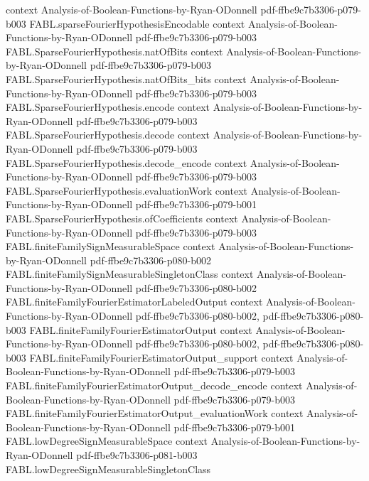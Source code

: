 \begin{theorem}
  {context}
  {Analysis-of-Boolean-Functions-by-Ryan-ODonnell}
  {pdf-ffbe9c7b3306-p079-b003}
\proofstep
  {FABL.sparseFourierHypothesisEncodable}
  {context}
  {Analysis-of-Boolean-Functions-by-Ryan-ODonnell}
  {pdf-ffbe9c7b3306-p079-b003}
\proofstep
  {FABL.SparseFourierHypothesis.natOfBits}
  {context}
  {Analysis-of-Boolean-Functions-by-Ryan-ODonnell}
  {pdf-ffbe9c7b3306-p079-b003}
\proofstep
  {FABL.SparseFourierHypothesis.natOfBits_bits}
  {context}
  {Analysis-of-Boolean-Functions-by-Ryan-ODonnell}
  {pdf-ffbe9c7b3306-p079-b003}
\proofstep
  {FABL.SparseFourierHypothesis.encode}
  {context}
  {Analysis-of-Boolean-Functions-by-Ryan-ODonnell}
  {pdf-ffbe9c7b3306-p079-b003}
\proofstep
  {FABL.SparseFourierHypothesis.decode}
  {context}
  {Analysis-of-Boolean-Functions-by-Ryan-ODonnell}
  {pdf-ffbe9c7b3306-p079-b003}
\proofstep
  {FABL.SparseFourierHypothesis.decode_encode}
  {context}
  {Analysis-of-Boolean-Functions-by-Ryan-ODonnell}
  {pdf-ffbe9c7b3306-p079-b003}
\proofstep
  {FABL.SparseFourierHypothesis.evaluationWork}
  {context}
  {Analysis-of-Boolean-Functions-by-Ryan-ODonnell}
  {pdf-ffbe9c7b3306-p079-b001}
\proofstep
  {FABL.SparseFourierHypothesis.ofCoefficients}
  {context}
  {Analysis-of-Boolean-Functions-by-Ryan-ODonnell}
  {pdf-ffbe9c7b3306-p079-b003}
\proofstep
  {FABL.finiteFamilySignMeasurableSpace}
  {context}
  {Analysis-of-Boolean-Functions-by-Ryan-ODonnell}
  {pdf-ffbe9c7b3306-p080-b002}
\proofstep
  {FABL.finiteFamilySignMeasurableSingletonClass}
  {context}
  {Analysis-of-Boolean-Functions-by-Ryan-ODonnell}
  {pdf-ffbe9c7b3306-p080-b002}
\proofstep
  {FABL.finiteFamilyFourierEstimatorLabeledOutput}
  {context}
  {Analysis-of-Boolean-Functions-by-Ryan-ODonnell}
  {pdf-ffbe9c7b3306-p080-b002,
    pdf-ffbe9c7b3306-p080-b003}
\proofstep
  {FABL.finiteFamilyFourierEstimatorOutput}
  {context}
  {Analysis-of-Boolean-Functions-by-Ryan-ODonnell}
  {pdf-ffbe9c7b3306-p080-b002,
    pdf-ffbe9c7b3306-p080-b003}
\proofstep
  {FABL.finiteFamilyFourierEstimatorOutput_support}
  {context}
  {Analysis-of-Boolean-Functions-by-Ryan-ODonnell}
  {pdf-ffbe9c7b3306-p079-b003}
\proofstep
  {FABL.finiteFamilyFourierEstimatorOutput_decode_encode}
  {context}
  {Analysis-of-Boolean-Functions-by-Ryan-ODonnell}
  {pdf-ffbe9c7b3306-p079-b003}
\proofstep
  {FABL.finiteFamilyFourierEstimatorOutput_evaluationWork}
  {context}
  {Analysis-of-Boolean-Functions-by-Ryan-ODonnell}
  {pdf-ffbe9c7b3306-p079-b001}
\proofstep
  {FABL.lowDegreeSignMeasurableSpace}
  {context}
  {Analysis-of-Boolean-Functions-by-Ryan-ODonnell}
  {pdf-ffbe9c7b3306-p081-b003}
\proofstep
  {FABL.lowDegreeSignMeasurableSingletonClass}

\end{theorem}
